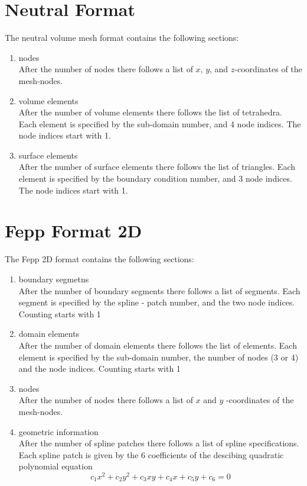 \documentclass[12pt]{book}
\begin{document}
\section{Neutral Format}
The neutral volume mesh format contains the following sections:

\begin{enumerate}
\item
nodes \\
After the number of nodes there follows a list of $x$, $y$, 
and $z$-coordinates of the mesh-nodes.
\item
volume elements \\
After the number of volume elements there follows the list of tetrahedra.
Each element is specified by the sub-domain number, and 4 node indices. The
node indices start with 1.
\item
surface elements \\ 
After the number of surface elements there follows
the list of triangles.  Each element is specified by the boundary
condition number, and 3 node indices. The node indices start with 1.
\end{enumerate}



\section{Fepp Format 2D}
The Fepp 2D format contains the following sections:

\begin{enumerate}
\item
boundary segmetns \\
After the number of boundary segments there follows a list of 
segments. Each segment is specified by the spline - patch number,
and the two node indices. Counting starts with 1
\item
domain elements \\
After the number of domain elements there follows the list of elements.
Each element is specified by the sub-domain number, the number of nodes (3 or 4) and the node indices. Counting starts with 1
\item
nodes \\
After the number of nodes there follows a list of $x$ and $y$ 
-coordinates of the mesh-nodes.
\item
geometric information \\
After the number of spline patches there follows a list of spline specifications. Each spline patch is given by the 6 coefficients of the descibing 
quadratic polynomial equation
$$
c_1 x^2 + c_2 y^2 + c_3 xy + c_4 x + c_5 y + c_6 = 0
$$
\end{enumerate}
\end{document}
